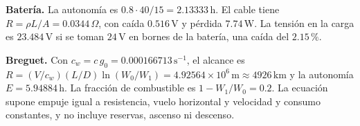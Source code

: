 \textbf{Batería.} La autonomía es $0.8\cdot40/15=2.13333\,\mathrm h$. El cable tiene $R=\rho L/A=0.0344\,\Omega$, con caída $0.516\,\mathrm V$ y pérdida $7.74\,\mathrm W$. La tensión en la carga es $23.484\,\mathrm V$ si se toman $24\,\mathrm V$ en bornes de la batería, una caída del $2.15\,\%$.

\textbf{Breguet.} Con $c_w=c\,g_0=0.000166713\,\mathrm{s^{-1}}$, el alcance es $R=(V/c_w)(L/D)\ln(W_0/W_1)=4.92564\times10^{6}\,\mathrm m\approx4926\,\mathrm{km}$ y la autonomía $E=5.94884\,\mathrm h$. La fracción de combustible es $1-W_1/W_0=0.2$. La ecuación supone empuje igual a resistencia, vuelo horizontal y velocidad y consumo constantes, y no incluye reservas, ascenso ni descenso.


